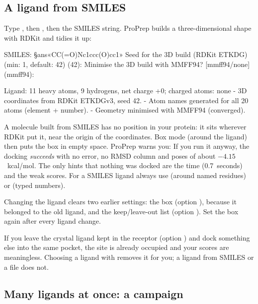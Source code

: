 \subsection{A ligand from SMILES}

Type , then , then the SMILES string. ProPrep builds a
three-dimensional shape with RDKit and tidies it up:

\begin{screen}
SMILES: §ans«CC(=O)Nc1ccc(O)cc1»
Seed for the 3D build (RDKit ETKDG) (min: 1, default: 42) (42):
Minimise the 3D build with MMFF94? [mmff94/none] (mmff94):

  Ligand: 11 heavy atoms, 9 hydrogens, net charge +0; charged atoms: none
  - 3D coordinates from RDKit ETKDGv3, seed 42.
  - Atom names generated for all 20 atoms (element + number).
  - Geometry minimised with MMFF94 (converged).
\end{screen}

\begin{watchout}
A molecule built from SMILES has no position in your protein: it sits
wherever RDKit put it, near the origin of the coordinates. Box mode 
(around the ligand) then puts the box in empty space. ProPrep warns you:
 If you run it anyway, the
docking \emph{succeeds} with no error, no RMSD column and poses of about
$-4.15$~kcal/mol. The only hints that nothing was docked are the time
(0.7~seconds) and the weak scores. For a SMILES ligand always use 
(around named residues) or  (typed numbers).
\end{watchout}

\begin{watchout}
Changing the ligand clears two earlier settings: the box (option ),
because it belonged to the old ligand, and the keep/leave-out list (option
). Set the box again after every ligand change.
\end{watchout}

\begin{watchout}
If you leave the crystal ligand kept in the receptor (option ) and dock
something else into the same pocket, the site is already occupied and your
scores are meaningless. Choosing a ligand with   removes it for
you; a ligand from SMILES or a file does not.
\end{watchout}

\subsection{Many ligands at once: a campaign}

